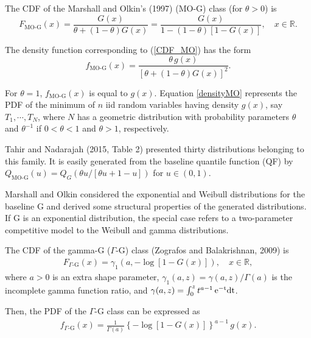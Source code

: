 \documentclass[twoside,leqno,11pt]{article}
\begin{document}
The CDF of the Marshall and Olkin's (1997) \cite{Marshall} ($\text{MO-G}$) 
class (for $\theta>0$) is
\begin{equation}\label{CDF_MO}
F_{\text{MO-G}}(x)=\frac{G(x)}{\theta+(1-\theta)G(x)}=\frac{G(x)}{1-(1-\theta)[1-G(x)]},\quad x \in \mathbb{R}.
\end{equation}

The density function corresponding to (\ref{CDF_MO}) has the form
\begin{equation}\label{densityMO}
f_{\text{MO-G}}(x)=\frac{\theta\, g(x)}{[\theta+(1-\theta)G(x)]^{2}}.
\end{equation}

For $\theta=1$, $f_{\text{MO-G}}(x)$ is equal to $g(x)$. 
Equation \eqref{densityMO} represents the PDF of the minimum of $n$ iid random variables having density $g(x)$, say $T_1,\cdots,T_N$, 
where $N$ has a geometric distribution with probability parameters $\theta$ and $\theta^{-1}$ if $0<\theta<1$ and $\theta>1$, 
respectively.

Tahir and Nadarajah (2015, Table 2) \cite{Tahir} presented thirty  distributions belonging to this family. It is easily generated  from the baseline quantile function (QF) by $Q_{\text{MO-G}}(u)=Q_{G}\left(\theta u / \left[\theta u+1-u\right]\right)$ for $u\in(0,1)$.

Marshall and Olkin considered the exponential and Weibull distributions for the baseline G and derived some
structural properties of the generated distributions. 
If G is an exponential distribution, the special case 
refers to a two-parameter competitive model to the 
Weibull and gamma distributions.

The CDF of the gamma-G ($\Gamma$-G) class (Zografos and Balakrishnan, 2009) \cite{Zografos}  is
\begin{eqnarray}\label{CDF_Ga}
F_{\Gamma\text{-G}}(x)=\gamma_1\left( a, -\log \left[1-G(x)\right]\right), \quad x \in \mathbb{R},
\end{eqnarray}
where $a>0$ is an extra shape parameter, $\gamma_1(a,z)= \gamma(a,z)/\Gamma(a)$ is the incomplete gamma function ratio, 
and $\gamma(a,z)=\int_0^{z} t^{a-1}\,\rm{e}^{-t}dt$.

Then, the PDF of the $\Gamma$-G class can be expressed as
\begin{eqnarray}\label{PDF_Ga}
\displaystyle
f_{\Gamma\text{-G}}(x)=\frac{\displaystyle 1}{\displaystyle \Gamma(a)} \left\{ -\log[1-G(x)] \right\}^{a-1}\, g(x).
\end{eqnarray}
\end{document}
